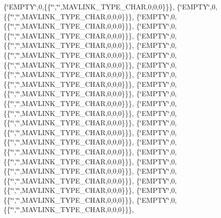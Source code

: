 \begin{DoxyCompactItemize}
\{\char`\"{}E\+M\+P\+TY\char`\"{},0,\{\{\char`\"{}\char`\"{},\char`\"{}\char`\"{},M\+A\+V\+L\+I\+N\+K\+\_\+\+T\+Y\+P\+E\+\_\+\+C\+H\+AR,0,0,0\}\}\}, \{\char`\"{}E\+M\+P\+TY\char`\"{},0,\{\{\char`\"{}\char`\"{},\char`\"{}\char`\"{},M\+A\+V\+L\+I\+N\+K\+\_\+\+T\+Y\+P\+E\+\_\+\+C\+H\+AR,0,0,0\}\}\}, \{\char`\"{}E\+M\+P\+TY\char`\"{},0,\{\{\char`\"{}\char`\"{},\char`\"{}\char`\"{},M\+A\+V\+L\+I\+N\+K\+\_\+\+T\+Y\+P\+E\+\_\+\+C\+H\+AR,0,0,0\}\}\}, \{\char`\"{}E\+M\+P\+TY\char`\"{},0,\{\{\char`\"{}\char`\"{},\char`\"{}\char`\"{},M\+A\+V\+L\+I\+N\+K\+\_\+\+T\+Y\+P\+E\+\_\+\+C\+H\+AR,0,0,0\}\}\}, \{\char`\"{}E\+M\+P\+TY\char`\"{},0,\{\{\char`\"{}\char`\"{},\char`\"{}\char`\"{},M\+A\+V\+L\+I\+N\+K\+\_\+\+T\+Y\+P\+E\+\_\+\+C\+H\+AR,0,0,0\}\}\}, \{\char`\"{}E\+M\+P\+TY\char`\"{},0,\{\{\char`\"{}\char`\"{},\char`\"{}\char`\"{},M\+A\+V\+L\+I\+N\+K\+\_\+\+T\+Y\+P\+E\+\_\+\+C\+H\+AR,0,0,0\}\}\}, \{\char`\"{}E\+M\+P\+TY\char`\"{},0,\{\{\char`\"{}\char`\"{},\char`\"{}\char`\"{},M\+A\+V\+L\+I\+N\+K\+\_\+\+T\+Y\+P\+E\+\_\+\+C\+H\+AR,0,0,0\}\}\}, \{\char`\"{}E\+M\+P\+TY\char`\"{},0,\{\{\char`\"{}\char`\"{},\char`\"{}\char`\"{},M\+A\+V\+L\+I\+N\+K\+\_\+\+T\+Y\+P\+E\+\_\+\+C\+H\+AR,0,0,0\}\}\}, \{\char`\"{}E\+M\+P\+TY\char`\"{},0,\{\{\char`\"{}\char`\"{},\char`\"{}\char`\"{},M\+A\+V\+L\+I\+N\+K\+\_\+\+T\+Y\+P\+E\+\_\+\+C\+H\+AR,0,0,0\}\}\}, \{\char`\"{}E\+M\+P\+TY\char`\"{},0,\{\{\char`\"{}\char`\"{},\char`\"{}\char`\"{},M\+A\+V\+L\+I\+N\+K\+\_\+\+T\+Y\+P\+E\+\_\+\+C\+H\+AR,0,0,0\}\}\}, \{\char`\"{}E\+M\+P\+TY\char`\"{},0,\{\{\char`\"{}\char`\"{},\char`\"{}\char`\"{},M\+A\+V\+L\+I\+N\+K\+\_\+\+T\+Y\+P\+E\+\_\+\+C\+H\+AR,0,0,0\}\}\}, \{\char`\"{}E\+M\+P\+TY\char`\"{},0,\{\{\char`\"{}\char`\"{},\char`\"{}\char`\"{},M\+A\+V\+L\+I\+N\+K\+\_\+\+T\+Y\+P\+E\+\_\+\+C\+H\+AR,0,0,0\}\}\}, \{\char`\"{}E\+M\+P\+TY\char`\"{},0,\{\{\char`\"{}\char`\"{},\char`\"{}\char`\"{},M\+A\+V\+L\+I\+N\+K\+\_\+\+T\+Y\+P\+E\+\_\+\+C\+H\+AR,0,0,0\}\}\}, \{\char`\"{}E\+M\+P\+TY\char`\"{},0,\{\{\char`\"{}\char`\"{},\char`\"{}\char`\"{},M\+A\+V\+L\+I\+N\+K\+\_\+\+T\+Y\+P\+E\+\_\+\+C\+H\+AR,0,0,0\}\}\}, \{\char`\"{}E\+M\+P\+TY\char`\"{},0,\{\{\char`\"{}\char`\"{},\char`\"{}\char`\"{},M\+A\+V\+L\+I\+N\+K\+\_\+\+T\+Y\+P\+E\+\_\+\+C\+H\+AR,0,0,0\}\}\}, \{\char`\"{}E\+M\+P\+TY\char`\"{},0,\{\{\char`\"{}\char`\"{},\char`\"{}\char`\"{},M\+A\+V\+L\+I\+N\+K\+\_\+\+T\+Y\+P\+E\+\_\+\+C\+H\+AR,0,0,0\}\}\}, \{\char`\"{}E\+M\+P\+TY\char`\"{},0,\{\{\char`\"{}\char`\"{},\char`\"{}\char`\"{},M\+A\+V\+L\+I\+N\+K\+\_\+\+T\+Y\+P\+E\+\_\+\+C\+H\+AR,0,0,0\}\}\}, \{\char`\"{}E\+M\+P\+TY\char`\"{},0,\{\{\char`\"{}\char`\"{},\char`\"{}\char`\"{},M\+A\+V\+L\+I\+N\+K\+\_\+\+T\+Y\+P\+E\+\_\+\+C\+H\+AR,0,0,0\}\}\}, \{\char`\"{}E\+M\+P\+TY\char`\"{},0,\{\{\char`\"{}\char`\"{},\char`\"{}\char`\"{},M\+A\+V\+L\+I\+N\+K\+\_\+\+T\+Y\+P\+E\+\_\+\+C\+H\+AR,0,0,0\}\}\}, \{\char`\"{}E\+M\+P\+TY\char`\"{},0,\{\{\char`\"{}\char`\"{},\char`\"{}\char`\"{},M\+A\+V\+L\+I\+N\+K\+\_\+\+T\+Y\+P\+E\+\_\+\+C\+H\+AR,0,0,0\}\}\}, \{\char`\"{}E\+M\+P\+TY\char`\"{},0,\{\{\char`\"{}\char`\"{},\char`\"{}\char`\"{},M\+A\+V\+L\+I\+N\+K\+\_\+\+T\+Y\+P\+E\+\_\+\+C\+H\+AR,0,0,0\}\}\}, \{\char`\"{}E\+M\+P\+TY\char`\"{},0,\{\{\char`\"{}\char`\"{},\char`\"{}\char`\"{},M\+A\+V\+L\+I\+N\+K\+\_\+\+T\+Y\+P\+E\+\_\+\+C\+H\+AR,0,0,0\}\}\}, 
\end{DoxyCompactItemize}
